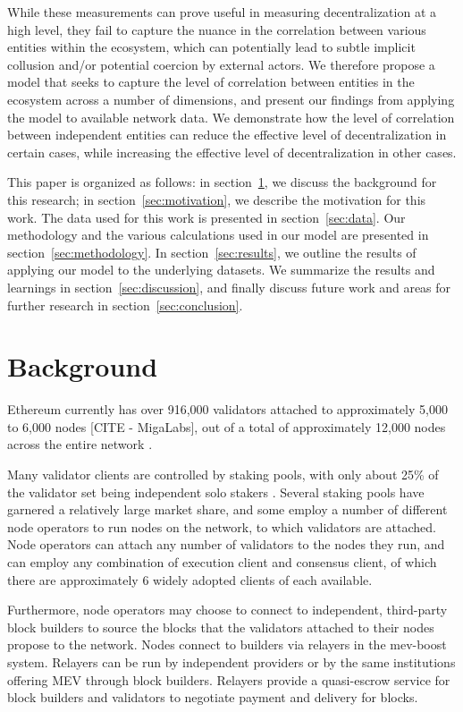 \documentclass[conference]{IEEEtran}
\begin{document}
While these measurements can prove useful in measuring decentralization at a high level, they fail to capture the nuance in the correlation between various entities within the ecosystem, which can potentially lead to subtle implicit collusion and/or potential coercion by external actors.  We therefore propose a model that seeks to capture the level of correlation between entities in the ecosystem across a number of dimensions, and present our findings from applying the model to available network data.  We demonstrate how the level of correlation between independent entities can reduce the effective level of decentralization in certain cases, while increasing the effective level of decentralization in other cases.

This paper is organized as follows: in section~\ref{sec:background}, we discuss the background for this research; in section~\ref{sec:motivation}, we describe the motivation for this work. The data used for this work is presented in section~\ref{sec:data}. Our methodology and the various calculations used in our model are presented in section~\ref{sec:methodology}.  In section~\ref{sec:results}, we outline the results of applying our model to the underlying datasets. We summarize the results and learnings in section~\ref{sec:discussion}, and finally discuss future work and areas for further research in section~\ref{sec:conclusion}.

\section{Background}
\label{sec:background}

Ethereum currently has over 916,000 validators \cite{beaconchain2024} attached to approximately 5,000 to 6,000 nodes [CITE - MigaLabs], out of a total of approximately 12,000 nodes across the entire network \cite{nodewatch2024}.

Many validator clients are controlled by staking pools, with only about 25\% of the validator set being independent solo stakers \cite{dune2024}.  Several staking pools have garnered a relatively large market share, and some employ a number of different node operators to run nodes on the network, to which validators are attached.  Node operators can attach any number of validators to the nodes they run, and can employ any combination of execution client and consensus client, of which there are approximately 6 widely adopted clients of each available.

Furthermore, node operators may choose to connect to independent, third-party block builders to source the blocks that the validators attached to their nodes propose to the network. Nodes connect to builders via relayers in the mev-boost system.  Relayers can be run by independent providers or by the same institutions offering MEV through block builders. Relayers provide a quasi-escrow service for block builders and validators to negotiate payment and delivery for blocks.
\end{document}
